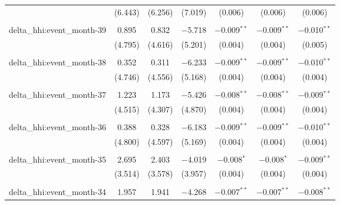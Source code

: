 \begin{table}[H]
{\begin{tabular}{@{\extracolsep{5pt}}lcccccc}
   & (6.443) & (6.256) & (7.019) & (0.006) & (0.006) & (0.006) \\  

   & & & & & & \\  

  delta\_hhi:event\_month-39 & 0.895 & 0.832 & $-$5.718 & $-$0.009$^{**}$ & $-$0.009$^{**}$ & $-$0.010$^{**}$ \\  

   & (4.795) & (4.616) & (5.201) & (0.004) & (0.004) & (0.005) \\  

   & & & & & & \\  

  delta\_hhi:event\_month-38 & 0.352 & 0.311 & $-$6.233 & $-$0.009$^{**}$ & $-$0.009$^{**}$ & $-$0.010$^{**}$ \\  

   & (4.746) & (4.556) & (5.168) & (0.004) & (0.004) & (0.004) \\  

   & & & & & & \\  

  delta\_hhi:event\_month-37 & 1.223 & 1.173 & $-$5.426 & $-$0.008$^{**}$ & $-$0.008$^{**}$ & $-$0.009$^{**}$ \\  

   & (4.515) & (4.307) & (4.870) & (0.004) & (0.004) & (0.004) \\  

   & & & & & & \\  

  delta\_hhi:event\_month-36 & 0.388 & 0.328 & $-$6.183 & $-$0.009$^{**}$ & $-$0.009$^{**}$ & $-$0.010$^{**}$ \\  

   & (4.800) & (4.597) & (5.169) & (0.004) & (0.004) & (0.004) \\  

   & & & & & & \\  

  delta\_hhi:event\_month-35 & 2.695 & 2.403 & $-$4.019 & $-$0.008$^{*}$ & $-$0.008$^{*}$ & $-$0.009$^{**}$ \\  

   & (3.514) & (3.578) & (3.957) & (0.004) & (0.004) & (0.004) \\  

   & & & & & & \\  

  delta\_hhi:event\_month-34 & 1.957 & 1.941 & $-$4.268 & $-$0.007$^{**}$ & $-$0.007$^{**}$ & $-$0.008$^{**}$ \\  


\end{tabular}}
\end{table}
